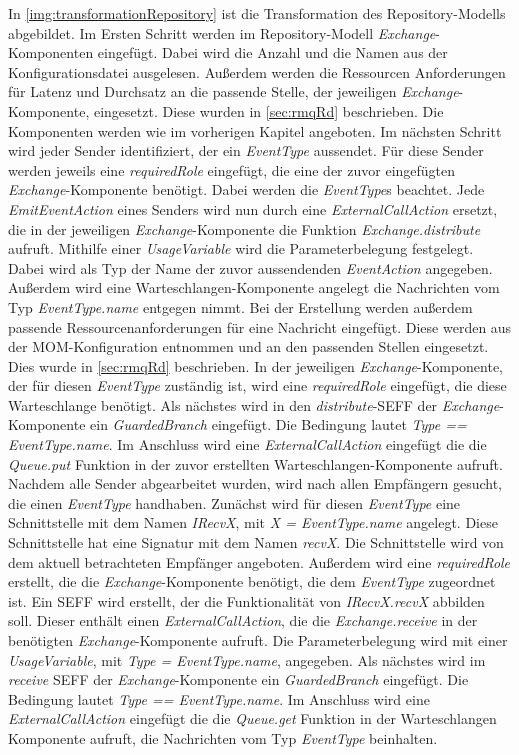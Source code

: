 In \autoref{img:transformationRepository} ist die Transformation des Repository-Modells abgebildet. Im Ersten Schritt werden im Repository-Modell \emph{Exchange}-Komponenten eingefügt. Dabei wird die Anzahl und die Namen aus der Konfigurationsdatei ausgelesen. Außerdem werden die Ressourcen Anforderungen für Latenz und Durchsatz an die passende Stelle, der jeweiligen \emph{Exchange}-Komponente, eingesetzt. Diese wurden in \autoref{sec:rmqRd} beschrieben. Die Komponenten werden wie im vorherigen Kapitel angeboten. Im nächsten Schritt wird jeder Sender identifiziert, der ein \emph{EventType} aussendet. Für diese Sender werden jeweils eine \emph{requiredRole} eingefügt, die eine der zuvor eingefügten \emph{Exchange}-Komponente benötigt. Dabei werden die \emph{EventType}s beachtet. Jede \emph{EmitEventAction} eines Senders wird nun durch eine \emph{ExternalCallAction} ersetzt, die in der jeweiligen \emph{Exchange}-Komponente die Funktion \emph{Exchange.distribute} aufruft. Mithilfe einer \emph{UsageVariable} wird die Parameterbelegung festgelegt. Dabei wird als Typ der Name der zuvor aussendenden \emph{EventAction} angegeben. Außerdem wird eine Warteschlangen-Komponente angelegt die Nachrichten vom Typ \emph{EventType.name} entgegen nimmt. Bei der Erstellung werden außerdem passende Ressourcenanforderungen für eine Nachricht eingefügt. Diese werden aus der MOM-Konfiguration entnommen und an den passenden Stellen eingesetzt. Dies wurde in \autoref{sec:rmqRd} beschrieben. In der jeweiligen \emph{Exchange}-Komponente, der für diesen \emph{EventType} zuständig ist, wird eine \emph{requiredRole} eingefügt, die diese Warteschlange benötigt. Als nächstes wird in den \emph{distribute}-SEFF der \emph{Exchange}-Komponente ein \emph{GuardedBranch} eingefügt. Die Bedingung lautet \emph{Type == EventType.name}. Im Anschluss wird eine \emph{ExternalCallAction} eingefügt die die \emph{Queue.put} Funktion in der zuvor erstellten Warteschlangen-Komponente aufruft. Nachdem alle Sender abgearbeitet wurden, wird nach allen Empfängern gesucht, die einen \emph{EventType} handhaben. Zunächst wird für diesen \emph{EventType} eine Schnittstelle mit dem Namen \emph{IRecvX}, mit \emph{X = EventType.name} angelegt. Diese Schnittstelle hat eine Signatur mit dem Namen \emph{recvX}. Die Schnittstelle wird von dem aktuell betrachteten Empfänger angeboten. Außerdem wird eine \emph{requiredRole} erstellt, die die \emph{Exchange}-Komponente benötigt, die dem \emph{EventType} zugeordnet ist. Ein SEFF wird erstellt, der die Funktionalität von \emph{IRecvX.recvX} abbilden soll. Dieser enthält einen \emph{ExternalCallAction}, die die \emph{Exchange.receive} in der benötigten \emph{Exchange}-Komponente aufruft. Die Parameterbelegung wird mit einer \emph{UsageVariable}, mit \emph{Type = EventType.name}, angegeben. Als nächstes wird im \emph{receive} SEFF der \emph{Exchange}-Komponente ein \emph{GuardedBranch} eingefügt. Die Bedingung lautet \emph{Type == EventType.name}. Im Anschluss wird eine \emph{ExternalCallAction} eingefügt die die \emph{Queue.get} Funktion in der Warteschlangen Komponente aufruft, die Nachrichten vom Typ \emph{EventType} beinhalten.

